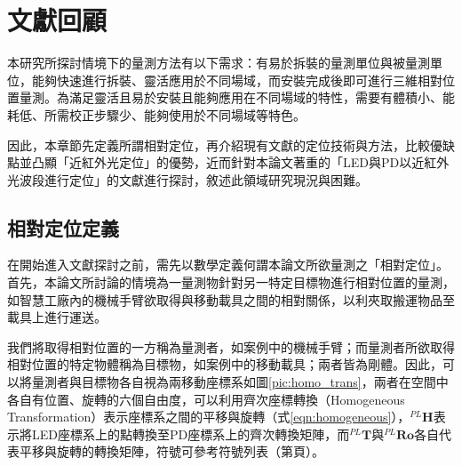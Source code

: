 \chapter{文獻回顧}




\cite{radiometry_and_photometry}


本研究所探討情境下的量測方法有以下需求：有易於拆裝的量測單位與被量測單位，能夠快速進行拆裝、靈活應用於不同場域，而安裝完成後即可進行三維相對位置量測。為滿足靈活且易於安裝且能夠應用在不同場域的特性，需要有體積小、能耗低、所需校正步驟少、能夠使用於不同場域等特色。

因此，本章節先定義所謂相對定位，再介紹現有文獻的定位技術與方法，比較優缺點並凸顯「近紅外光定位」的優勢，近而針對本論文著重的「LED與PD以近紅外光波段進行定位」的文獻進行探討，敘述此領域研究現況與困難。








\section{相對定位定義}
    
    在開始進入文獻探討之前，需先以數學定義何謂本論文所欲量測之「相對定位」。首先，本論文所討論的情境為一量測物針對另一特定目標物進行相對位置的量測，如智慧工廠內的機械手臂欲取得與移動載具之間的相對關係，以利夾取搬運物品至載具上進行運送。
    
    我們將取得相對位置的一方稱為量測者，如案例中的機械手臂；而量測者所欲取得相對位置的特定物體稱為目標物，如案例中的移動載具；兩者皆為剛體。因此，可以將量測者與目標物各自視為兩移動座標系如圖\ref{pic:homo_trans}，兩者在空間中各自有位置、旋轉的六個自由度，可以利用齊次座標轉換（Homogeneous Transformation）表示座標系之間的平移與旋轉（式\ref{eqn:homogeneous}），$^{PL}\boldsymbol{H}$表示將LED座標系上的點轉換至PD座標系上的齊次轉換矩陣，而$^{PL}\boldsymbol{T}$與$^{PL}\boldsymbol{Ro}$各自代表平移與旋轉的轉換矩陣，符號可參考符號列表（第\pageref{chp:symbol}頁）。
  
